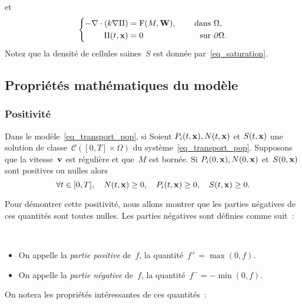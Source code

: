 \documentclass[main.tex]{subfiles}
\begin{document}
et
\begin{equation}
\left\{ \begin{aligned}
 \label{eq_pression}
 -\nabla\cdot\left(k\nabla \Pi\right) &={\rm F}(M,{\bf W}), &\quad \textrm{ dans } & \Omega , \\
    \Pi(t,\mathbf{x}) &=0 & \quad \textrm{ sur  }& \partial \Omega.
\end{aligned}
\right. \end{equation}
Notez que la densité de cellules saines~$S$ est donnée par~\eqref{eq_saturation}.


\subsection{Propriétés mathématiques du modèle}
\subsubsection{Positivité}
\begin{prop}\label{prop:positivite_modele}
Dans le modèle~\eqref{eq_transport_pop}, si
Soient $P_i(t,\mathbf{x}), N(t,\mathbf{x}) $ et $S(t,\mathbf{x})$ une solution de classe~$\mathcal{C}([0,T]\times \Omega)$ du système~\eqref{eq_transport_pop}. Supposons que la vitesse~$\mathbf{v}$ est régulière et que~$M$ est bornée. Si $P_i(0,\mathbf{x}), N(0,\mathbf{x})$ et~$S(0,\mathbf{x})$ sont positives ou nulles alors 
$$\forall t \in [0,T], \quad  N(t,\mathbf{x})\geq0, \quad  P_i(t,\mathbf{x})\geq0, \quad S(t,\mathbf{x})\geq0. $$
\end{prop}
Pour démontrer cette positivité, nous allons montrer que les parties négatives de ces quantités sont toutes nulles. Les parties négatives sont définies comme suit~:
\begin{dfn}~
\begin{itemize}
\item On appelle la \emph{partie positive} de~$f$, la quantité~$f^+=\max(0,f)$.
\item On appelle la \emph{partie négative} de~$f$, la quantité~$f^-=-\min(0,f)$.
\end{itemize}
\end{dfn}
On notera les propriétés intéressantes de ces quantités~:
\end{document}
